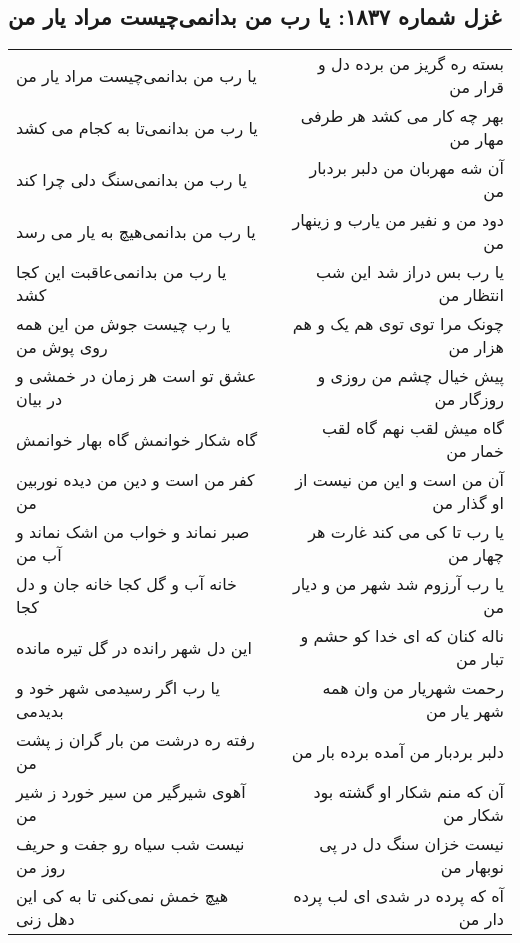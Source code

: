 \begin{center}
\section*{غزل شماره ۱۸۳۷: یا رب من بدانمی‌چیست مراد یار من}
\label{sec:1837}
\begin{longtable}{l p{0.5cm} r}
یا رب من بدانمی‌چیست مراد یار من
&&
بسته ره گریز من برده دل و قرار من
\\
یا رب من بدانمی‌تا به کجام می کشد
&&
بهر چه کار می کشد هر طرفی مهار من
\\
یا رب من بدانمی‌سنگ دلی چرا کند
&&
آن شه مهربان من دلبر بردبار من
\\
یا رب من بدانمی‌هیچ به یار می رسد
&&
دود من و نفیر من یارب و زینهار من
\\
یا رب من بدانمی‌عاقبت این کجا کشد
&&
یا رب بس دراز شد این شب انتظار من
\\
یا رب چیست جوش من این همه روی پوش من
&&
چونک مرا توی توی هم یک و هم هزار من
\\
عشق تو است هر زمان در خمشی و در بیان
&&
پیش خیال چشم من روزی و روزگار من
\\
گاه شکار خوانمش گاه بهار خوانمش
&&
گاه میش لقب نهم گاه لقب خمار من
\\
کفر من است و دین من دیده نوربین من
&&
آن من است و این من نیست از او گذار من
\\
صبر نماند و خواب من اشک نماند و آب من
&&
یا رب تا کی می کند غارت هر چهار من
\\
خانه آب و گل کجا خانه جان و دل کجا
&&
یا رب آرزوم شد شهر من و دیار من
\\
این دل شهر رانده در گل تیره مانده
&&
ناله کنان که ای خدا کو حشم و تبار من
\\
یا رب اگر رسیدمی شهر خود و بدیدمی
&&
رحمت شهریار من وان همه شهر یار من
\\
رفته ره درشت من بار گران ز پشت من
&&
دلبر بردبار من آمده برده بار من
\\
آهوی شیرگیر من سیر خورد ز شیر من
&&
آن که منم شکار او گشته بود شکار من
\\
نیست شب سیاه رو جفت و حریف روز من
&&
نیست خزان سنگ دل در پی نوبهار من
\\
هیچ خمش نمی‌کنی تا به کی این دهل زنی
&&
آه که پرده در شدی ای لب پرده دار من
\\
\end{longtable}
\end{center}
